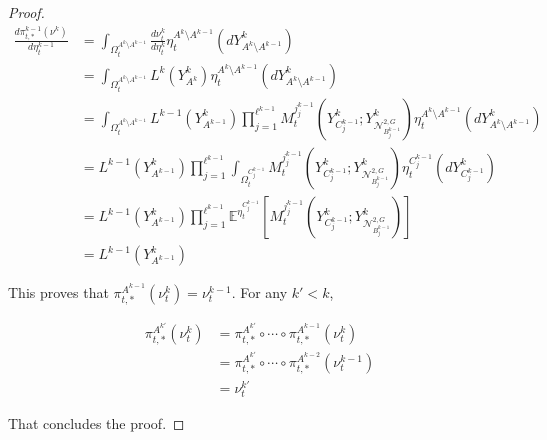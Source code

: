 \documentclass[12pt]{article}
\newcommand{\mb}{\mathbb}
\newcommand{\mc}{\mathcal}
\newcommand{\exmu}[2]{\mb{E}^{#1}\left[#2\right]}	%
\newcommand{\dgneigh}[2]{\mc{N}^{2,#1}_{#2}}		%
\newcommand{\indx}[1]{^{#1}}						%
\newcommand{\proj}{\pi}								%
\newcommand{\vind}[1]{_{#1}}						%
\newcommand{\vpara}[1]{^{#1}}						%
\newcommand{\tpara}[1]{_{#1}}						%
\newcommand{\tparapsf}[1]{_{#1,*}}					%
\newcommand{\psize}{\ell}							%
\newcommand{\Xg}{Y}									%
\newcommand{\mm}{\nu}								%
\newcommand{\mmm}{\eta}								%
\newcommand{\dense}{L}								%
\newcommand{\mdense}{M}								%
\newcommand{\jpara}[1]{^{#1}}						%
\begin{document}
\begin{proof}
\begin{align*}
\frac{d\proj\tparapsf{t}\indx{k-1}(\mm\indx{k})}{d\mmm\indx{k-1}\tpara{t}} &= \int_{\Omega\vpara{A\indx{k}\setminus A\indx{k-1}}\tpara{t}} \frac{d\mm\indx{k}\tpara{t}}{d\mmm\indx{k}\tpara{t}}\mmm\vpara{A\indx{k}\setminus A\indx{k-1}}\tpara{t}(d\Xg\indx{k}\vind{A\indx{k}\setminus A\indx{k-1}})\\
&=\int_{\Omega\vpara{A\indx{k}\setminus A\indx{k-1}}\tpara{t}} \dense\indx{k}(\Xg\indx{k}\vind{A\indx{k}})\mmm\vpara{A\indx{k}\setminus A\indx{k-1}}\tpara{t}(d\Xg\indx{k}\vind{A\indx{k}\setminus A\indx{k-1}})\\
&=\int_{\Omega\vpara{A\indx{k}\setminus A\indx{k-1}}\tpara{t}} \dense\indx{k-1}(\Xg\indx{k}\vind{A\indx{k-1}})\prod_{j=1}^{\psize\indx{k-1}}\mdense\jpara{j_j\indx{k-1}}\tpara{t}\left(\Xg\indx{k}\vind{C_j\indx{k-1}};\Xg\indx{k}\vind{\dgneigh{G}{B_j\indx{k-1}}}\right)\mmm\vpara{A\indx{k}\setminus A\indx{k-1}}\tpara{t}(d\Xg\indx{k}\vind{A\indx{k}\setminus A\indx{k-1}})\\
&=\dense\indx{k-1}(\Xg\indx{k}\vind{A\indx{k-1}})\prod_{j=1}^{\psize\indx{k-1}} \int_{\Omega\vpara{C_j\indx{k-1}}\tpara{t}}\mdense\jpara{j_j\indx{k-1}}\tpara{t}\left(\Xg\indx{k}\vind{C_j\indx{k-1}};\Xg\indx{k}\vind{\dgneigh{G}{B_j\indx{k-1}}}\right)\mmm\vpara{C_j\indx{k-1}}\tpara{t}(d\Xg\indx{k}\vind{C_j\indx{k-1}})\\
&=\dense\indx{k-1}(\Xg\indx{k}\vind{A\indx{k-1}})\prod_{j=1}^{\psize\indx{k-1}} \exmu{\mmm\vpara{C_j\indx{k-1}}\tpara{t}}{\mdense\jpara{j_j\indx{k-1}}\tpara{t}\left(\Xg\indx{k}\vind{C_j\indx{k-1}};\Xg\indx{k}\vind{\dgneigh{G}{B_j\indx{k-1}}}\right)}\\
&=\dense\indx{k-1}(\Xg\indx{k}\vind{A\indx{k-1}})
\end{align*}

This proves that \(\proj\tparapsf{t}\vpara{A\indx{k-1}}(\mm\indx{k}\tpara{t}) = \mm\indx{k-1}\tpara{t}\). For any \(k' < k\),

\begin{align*}
\proj\tparapsf{t}\vpara{A\indx{k'}}(\mm\indx{k}\tpara{t}) &= \proj\tparapsf{t}\vpara{A\indx{k'}}\circ\cdots\circ\proj\tparapsf{t}\vpara{A\indx{k-1}}(\mm\indx{k}\tpara{t})\\
&=\proj\tparapsf{t}\vpara{A\indx{k'}}\circ\cdots\circ\proj\tparapsf{t}\vpara{A\indx{k-2}}(\mm\indx{k-1}\tpara{t})\\
&= \mm\indx{k'}\tpara{t}
\end{align*}

That concludes the proof.
\end{proof}
\end{document}
